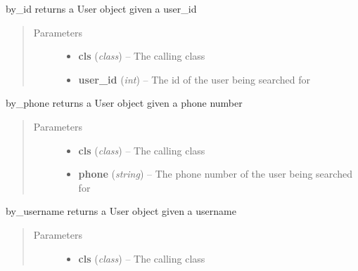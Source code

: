 \documentclass[letterpaper,10pt,english]{sphinxmanual}
\begin{document}
\begin{fulllineitems}
\begin{fulllineitems}
\label{dev-users:cagenix.users.models.User.by_id}
by\_id returns a User object given a user\_id
\begin{quote}\begin{description}
\item[{Parameters}] \leavevmode\begin{itemize}
\item {} 
\textbf{cls} (\emph{class}) -- The calling class

\item {} 
\textbf{user\_id} (\emph{int}) -- The id of the user being searched for

\end{itemize}

\end{description}\end{quote}

\end{fulllineitems}


\begin{fulllineitems}
\label{dev-users:cagenix.users.models.User.by_phone}
by\_phone returns a User object given a phone number
\begin{quote}\begin{description}
\item[{Parameters}] \leavevmode\begin{itemize}
\item {} 
\textbf{cls} (\emph{class}) -- The calling class

\item {} 
\textbf{phone} (\emph{string}) -- The phone number of the user being searched for

\end{itemize}

\end{description}\end{quote}

\end{fulllineitems}


\begin{fulllineitems}
\label{dev-users:cagenix.users.models.User.by_username}
by\_username returns a User object given a username
\begin{quote}\begin{description}
\item[{Parameters}] \leavevmode\begin{itemize}
\item {} 
\textbf{cls} (\emph{class}) -- The calling class


\end{itemize}
\end{description}
\end{quote}
\end{fulllineitems}
\end{fulllineitems}
\end{document}
